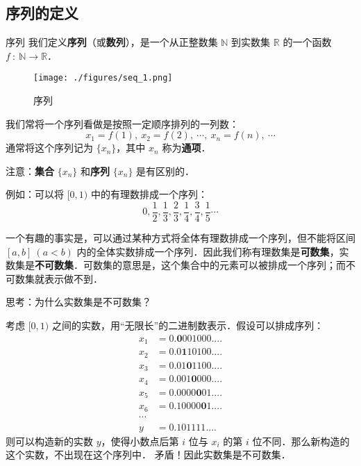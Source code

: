 
\subsection{序列的定义}
\begin{definition}{序列}
我们定义\textbf{序列}（或\textbf{数列}），是一个从正整数集 $\mathbb{N}$  到实数集 $\mathbb{R}$ 的一个函数 $f\ :\ \mathbb{N}\rightarrow \mathbb{R}$．
\end{definition}
\begin{figure}[ht]
\centering
\texttt{[image: ./figures/seq\_1.png]}
\caption{序列} \label{seq_fig1}
\end{figure}
我们常将一个序列看做是按照一定顺序排列的一列数：
$$
x_1=f(1),\ x_2=f(2),\ \cdots,\ x_n=f(n),\ \cdots
$$
通常将这个序列记为 $\{x_n\}$，其中 $x_n$ 称为\textbf{通项}．

注意：\textbf{集合} $\{x_n\}$ 和\textbf{序列} $\{x_n\}$ 是有区别的．

例如：可以将 $[0,1)$ 中的有理数排成一个序列：
$$
0,\frac{1}{2},\frac{1}{3},\frac{2}{3},\frac{1}{4},\frac{3}{4},\frac{1}{5}\cdots
$$

一个有趣的事实是，可以通过某种方式将全体有理数排成一个序列，但不能将区间 $[a,b]\ (a<b)$ 内的全体实数排成一个序列．因此我们称有理数集是\textbf{可数集}，实数集是\textbf{不可数集}．可数集的意思是，这个集合中的元素可以被排成一个序列；而不可数集就表示做不到．

\begin{example}{}
思考：为什么实数集是不可数集？

考虑 $[0,1)$ 之间的实数，用“无限长”的二进制数表示．假设可以排成序列： 
\begin{equation}
\begin{aligned}
x_1&=0.\boldsymbol 0001000....\\
x_2&=0.0\boldsymbol 110100....\\
x_3&=0.01\boldsymbol 01100....\\
x_4&=0.001\boldsymbol 0000....\\
x_5&=0.0000\boldsymbol 001....\\
x_6&=0.10000\boldsymbol 01....\\
\cdots
\\
y&=0.101111....
\end{aligned}
\end{equation}
​则可以构造新的实数 $y$，使得小数点后第 $i$ 位与 $x_i$ 的第 $i$ 位不同．那么新构造的这个实数，不出现在这个序列中．
矛盾！因此实数集是不可数集．
\end{example}

​		

​		